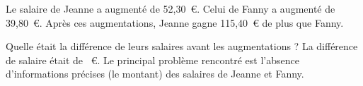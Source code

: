 Le salaire de Jeanne a augmenté de 52,30~\textgreek{\euro}. Celui de
Fanny a augmenté de 39,80~\textgreek{\euro}. Après ces augmentations,
Jeanne gagne 115,40~\textgreek{\euro} de plus que Fanny.\par Quelle
était la différence de leurs salaires avant les augmentations ?
\kern2cm\kern2cm La différence de salaire était de ~\textgreek{\euro}.
Le principal problème rencontré est l'absence d'informations précises (le montant) des salaires de Jeanne et Fanny.